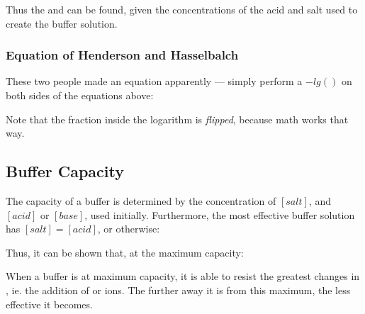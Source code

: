 

			Thus the \pH{} and \pOH{} can be found, given the concentrations of the acid and salt used to create the buffer solution.


			\subsubsection{Equation of Henderson and Hasselbalch}

				These two people made an equation apparently --- simply perform a $-lg()$ on both sides of the equations above:


				Note that the fraction inside the logarithm is \textit{flipped}, because math works that way.




		\subsection{Buffer Capacity}

			The capacity of a buffer is determined by the concentration of $[salt]$, and $[acid]$ or $[base]$, used initially. Furthermore,
			the most effective buffer solution has $[salt] = [acid]$, or otherwise:


			Thus, it can be shown that, at the maximum capacity:


			When a buffer is at maximum capacity, it is able to resist the greatest changes in \pH{}, ie. the addition of  or 
			ions. The further away it is from this maximum, the less effective it becomes.


